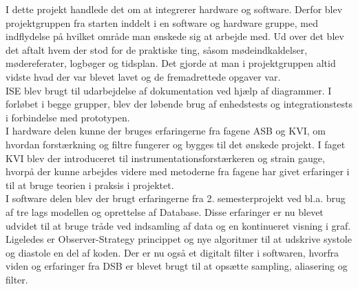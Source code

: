 I dette projekt handlede det om at integrerer hardware og software. Derfor blev projektgruppen fra starten inddelt i en software og hardware gruppe, med indflydelse på hvilket område man ønskede sig at arbejde med. Ud over det blev det aftalt hvem der stod for de praktiske ting, såsom mødeindkaldelser, mødereferater, logbøger og tidsplan. Det gjorde at man i projektgruppen altid vidste hvad der var blevet lavet og de fremadrettede opgaver var.\\
ISE blev brugt til udarbejdelse af dokumentation ved hjælp af diagrammer. I forløbet i begge grupper, blev der løbende brug af enhedstests og integrationstests i forbindelse med prototypen.\\
I hardware delen kunne der bruges erfaringerne fra fagene ASB og KVI, om hvordan forstærkning og filtre fungerer og bygges til det ønskede projekt. I faget KVI blev der introduceret til instrumentationsforstærkeren og strain gauge, hvorpå der kunne arbejdes videre med metoderne fra fagene har givet erfaringer i til at bruge teorien i praksis i projektet.\\
I software delen blev der brugt erfaringerne fra 2. semesterprojekt ved bl.a. brug af tre lags modellen og oprettelse af Database. Disse erfaringer er nu blevet udvidet til at bruge tråde ved indsamling af data og en kontinueret visning i graf. Ligeledes er Observer-Strategy princippet og nye algoritmer til at udskrive systole og diastole en del af koden. Der er nu også et digitalt filter i softwaren, hvorfra viden og erfaringer fra DSB er blevet brugt til at opsætte sampling, aliasering og filter.







